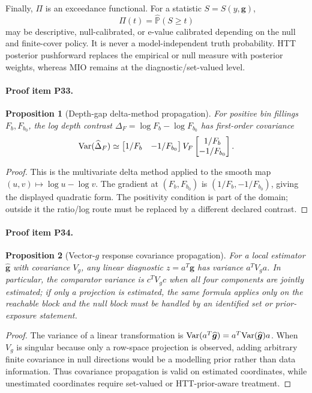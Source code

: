 \documentclass[11pt]{article}
\newcommand{\Prob}{\mathbb{P}}
\newtheorem{proposition}{Proposition}
\begin{document}
Finally, \(\Pi\) is an exceedance functional.  For a statistic \(S=S(y,\bm g)\),
\[
  \Pi(t)=\widehat{\Prob}(S\ge t)
\]
may be descriptive, null-calibrated, or e-value calibrated depending on the null and finite-cover policy.  It is never a model-independent truth probability.  HTT posterior pushforward replaces the empirical or null measure with posterior weights, whereas MIO remains at the diagnostic/set-valued level.

\paragraph{Proof item P33.}
\begin{proposition}[Depth-gap delta-method propagation]
For positive bin fillings \(F_b,F_{b_0}\), the log depth contrast \(\Delta_F=\log F_b-\log F_{b_0}\) has first-order covariance
\[
  {\rm Var}(\widehat\Delta_F)
  \simeq
  \begin{bmatrix}1/F_b&-1/F_{b_0}\end{bmatrix}
  V_F
  \begin{bmatrix}1/F_b\\-1/F_{b_0}\end{bmatrix}.
\]
\end{proposition}
\begin{proof}
This is the multivariate delta method applied to the smooth map \((u,v)\mapsto\log u-\log v\).  The gradient at \((F_b,F_{b_0})\) is \((1/F_b,-1/F_{b_0})\), giving the displayed quadratic form.  The positivity condition is part of the domain; outside it the ratio/log route must be replaced by a different declared contrast.
\end{proof}

\paragraph{Proof item P34.}
\begin{proposition}[Vector-\(g\) response covariance propagation]
For a local estimator \(\widehat{\bm g}\) with covariance \(V_g\), any linear diagnostic \(z=a^T\bm g\) has variance \(a^TV_ga\).  In particular, the comparator variance is \(c^TV_gc\) when all four components are jointly estimated; if only a projection is estimated, the same formula applies only on the reachable block and the null block must be handled by an identified set or prior-exposure statement.
\end{proposition}
\begin{proof}
The variance of a linear transformation is \({\rm Var}(a^T\widehat{\bm g})=a^T{\rm Var}(\widehat{\bm g})a\).  When \(V_g\) is singular because only a row-space projection is observed, adding arbitrary finite covariance in null directions would be a modelling prior rather than data information.  Thus covariance propagation is valid on estimated coordinates, while unestimated coordinates require set-valued or HTT-prior-aware treatment.
\end{proof}
\end{document}
